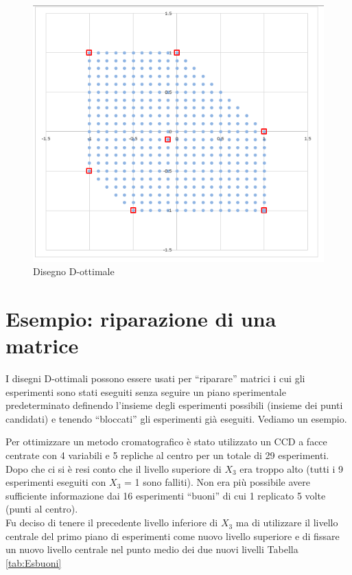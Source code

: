 \documentclass[
  11pt,
]{book}
\begin{document}
\begin{figure}[ht]

{\centering \includegraphics[width=1\linewidth]{Immagini/D_opt/07_es1_pticandidati} 

}

\caption{Disegno D-ottimale}\label{fig:fig7}
\end{figure}

\hypertarget{esempio-riparazione-di-una-matrice}{%
\section{Esempio: riparazione di una matrice}\label{esempio-riparazione-di-una-matrice}}

I disegni D-ottimali possono essere usati per ``riparare'' matrici i cui gli esperimenti sono stati eseguiti senza seguire un piano sperimentale predeterminato
definendo l'insieme degli esperimenti possibili (insieme dei punti candidati) e tenendo ``bloccati'' gli esperimenti già eseguiti.
Vediamo un esempio.

Per ottimizzare un metodo cromatografico \citep{r.leardi2018} è stato utilizzato un CCD a facce centrate con 4 variabili e 5 repliche al centro per un totale di 29 esperimenti.
Dopo che ci si è resi conto che il livello superiore di \(X_3\) era troppo alto (tutti i 9 esperimenti eseguiti con \(X_3\) = 1 sono falliti). Non era più possibile avere sufficiente informazione dai 16 esperimenti ``buoni'' di cui 1 replicato 5 volte (punti al centro).\\
Fu deciso di tenere il precedente livello inferiore di \(X_3\) ma di utilizzare il livello centrale del primo piano di esperimenti come nuovo livello superiore e di fissare un nuovo livello centrale nel punto medio dei due nuovi livelli Tabella \ref{tab:Esbuoni}
\end{document}
